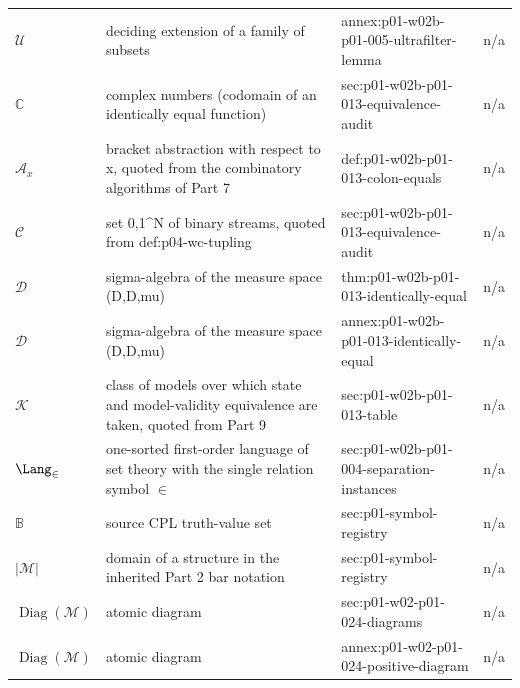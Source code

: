 \begin{longtable}{@{}p{}p{}p{}p{}@{}}
\(\mathcal U\) & deciding extension of a family of subsets & annex:\allowbreak{}p01-\allowbreak{}w02b-\allowbreak{}p01-\allowbreak{}005-\allowbreak{}ultrafilter-\allowbreak{}lemma & n/a \\
\(\mathbb C\) & complex numbers (codomain of an identically equal function) & sec:\allowbreak{}p01-\allowbreak{}w02b-\allowbreak{}p01-\allowbreak{}013-\allowbreak{}equivalence-\allowbreak{}audit & n/a \\
\(\mathcal A_x\) & bracket abstraction with respect to x, quoted from the combinatory algorithms of Part 7 & def:\allowbreak{}p01-\allowbreak{}w02b-\allowbreak{}p01-\allowbreak{}013-\allowbreak{}colon-\allowbreak{}equals & n/a \\
\(\mathcal C\) & set {0,1}\^{}N of binary streams, quoted from def:p04-wc-tupling & sec:\allowbreak{}p01-\allowbreak{}w02b-\allowbreak{}p01-\allowbreak{}013-\allowbreak{}equivalence-\allowbreak{}audit & n/a \\
\(\mathcal D\) & sigma-algebra of the measure space (D,D,mu) & thm:\allowbreak{}p01-\allowbreak{}w02b-\allowbreak{}p01-\allowbreak{}013-\allowbreak{}identically-\allowbreak{}equal & n/a \\
\(\mathcal D\) & sigma-algebra of the measure space (D,D,mu) & annex:\allowbreak{}p01-\allowbreak{}w02b-\allowbreak{}p01-\allowbreak{}013-\allowbreak{}identically-\allowbreak{}equal & n/a \\
\(\mathcal K\) & class of models over which state and model-validity equivalence are taken, quoted from Part 9 & sec:\allowbreak{}p01-\allowbreak{}w02b-\allowbreak{}p01-\allowbreak{}013-\allowbreak{}table & n/a \\
\(\Lang_{\in}\) & one-sorted first-order language of set theory with the single relation symbol \(\in\) & sec:\allowbreak{}p01-\allowbreak{}w02b-\allowbreak{}p01-\allowbreak{}004-\allowbreak{}separation-\allowbreak{}instances & n/a \\
\(\mathbb B\) & source CPL truth-value set & sec:\allowbreak{}p01-\allowbreak{}symbol-\allowbreak{}registry & n/a \\
\(\lvert\mathcal M\rvert\) & domain of a structure in the inherited Part 2 bar notation & sec:\allowbreak{}p01-\allowbreak{}symbol-\allowbreak{}registry & n/a \\
\(\operatorname{Diag}(\mathcal M)\) & atomic diagram & sec:\allowbreak{}p01-\allowbreak{}w02-\allowbreak{}p01-\allowbreak{}024-\allowbreak{}diagrams & n/a \\
\(\operatorname{Diag}(\mathcal M)\) & atomic diagram & annex:\allowbreak{}p01-\allowbreak{}w02-\allowbreak{}p01-\allowbreak{}024-\allowbreak{}positive-\allowbreak{}diagram & n/a \\

\end{longtable}
